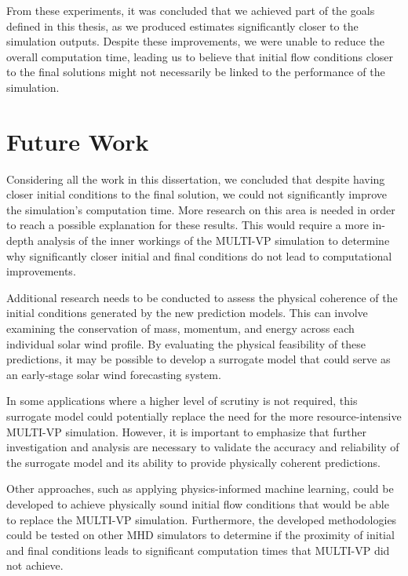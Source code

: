 From these experiments, it was concluded that we achieved part of the goals defined in this thesis, as we produced estimates significantly closer to the simulation outputs. Despite these improvements, we were unable to reduce the overall computation time, leading us to believe that initial flow conditions closer to the final solutions might not necessarily be linked to the performance of the simulation.


\section{Future Work}\label{sec:future_work}
Considering all the work in this dissertation, we concluded that despite having closer initial conditions to the final solution, we could not significantly improve the simulation's computation time. More research on this area is needed in order to reach a possible explanation for these results. This would require a more in-depth analysis of the inner workings of the MULTI-VP simulation to determine why significantly closer initial and final conditions do not lead to computational improvements.

Additional research needs to be conducted to assess the physical coherence of the initial conditions generated by the new prediction models. This can involve examining the conservation of mass, momentum, and energy across each individual solar wind profile. By evaluating the physical feasibility of these predictions, it may be possible to develop a surrogate model that could serve as an early-stage solar wind forecasting system.

In some applications where a higher level of scrutiny is not required, this surrogate model could potentially replace the need for the more resource-intensive MULTI-VP simulation. However, it is important to emphasize that further investigation and analysis are necessary to validate the accuracy and reliability of the surrogate model and its ability to provide physically coherent predictions.

Other approaches, such as applying physics-informed machine learning, could be developed to achieve physically sound initial flow conditions that would be able to replace the MULTI-VP simulation. Furthermore, the developed methodologies could be tested on other MHD simulators to determine if the proximity of initial and final conditions leads to significant computation times that MULTI-VP did not achieve.




















